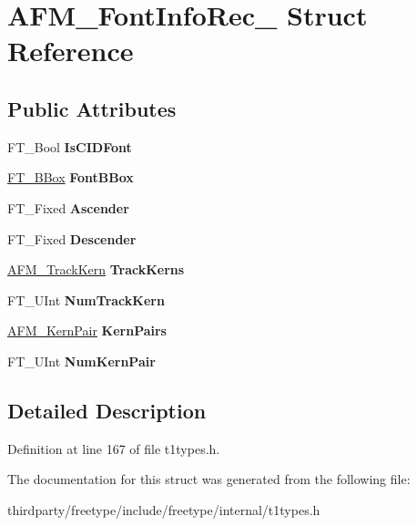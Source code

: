 \hypertarget{struct_a_f_m___font_info_rec__}{}\section{A\+F\+M\+\_\+\+Font\+Info\+Rec\+\_\+ Struct Reference}
\label{struct_a_f_m___font_info_rec__}
\subsection*{Public Attributes}
\begin{DoxyCompactItemize}
\item 
\mbox{\label{struct_a_f_m___font_info_rec___a6f198e74da5d8a3b7ff7518e255be231}} 
F\+T\+\_\+\+Bool {\bfseries Is\+C\+I\+D\+Font}
\item 
\mbox{\label{struct_a_f_m___font_info_rec___afa5112d6b0cc51839889206012dc1be6}} 
\hyperlink{struct_f_t___b_box__}{F\+T\+\_\+\+B\+Box} {\bfseries Font\+B\+Box}
\item 
\mbox{\label{struct_a_f_m___font_info_rec___a0b80412562435a2198a71aa4188ee85b}} 
F\+T\+\_\+\+Fixed {\bfseries Ascender}
\item 
\mbox{\label{struct_a_f_m___font_info_rec___a3561507200f0bc3413988af920924053}} 
F\+T\+\_\+\+Fixed {\bfseries Descender}
\item 
\mbox{\label{struct_a_f_m___font_info_rec___a8d9305229a1dacc15b8fceb5dbf25b9d}} 
\hyperlink{struct_a_f_m___track_kern_rec__}{A\+F\+M\+\_\+\+Track\+Kern} {\bfseries Track\+Kerns}
\item 
\mbox{\label{struct_a_f_m___font_info_rec___a9f7403b78d67694d7ee3bbe508ed7827}} 
F\+T\+\_\+\+U\+Int {\bfseries Num\+Track\+Kern}
\item 
\mbox{\label{struct_a_f_m___font_info_rec___a16c5da5249d4d4f68cc169469f3ee75a}} 
\hyperlink{struct_a_f_m___kern_pair_rec__}{A\+F\+M\+\_\+\+Kern\+Pair} {\bfseries Kern\+Pairs}
\item 
\mbox{\label{struct_a_f_m___font_info_rec___a7cd843bafa42fa62586c67d75ffbe85d}} 
F\+T\+\_\+\+U\+Int {\bfseries Num\+Kern\+Pair}
\end{DoxyCompactItemize}


\subsection{Detailed Description}


Definition at line 167 of file t1types.\+h.



The documentation for this struct was generated from the following file\+:\begin{DoxyCompactItemize}
\item 
thirdparty/freetype/include/freetype/internal/t1types.\+h\end{DoxyCompactItemize}
